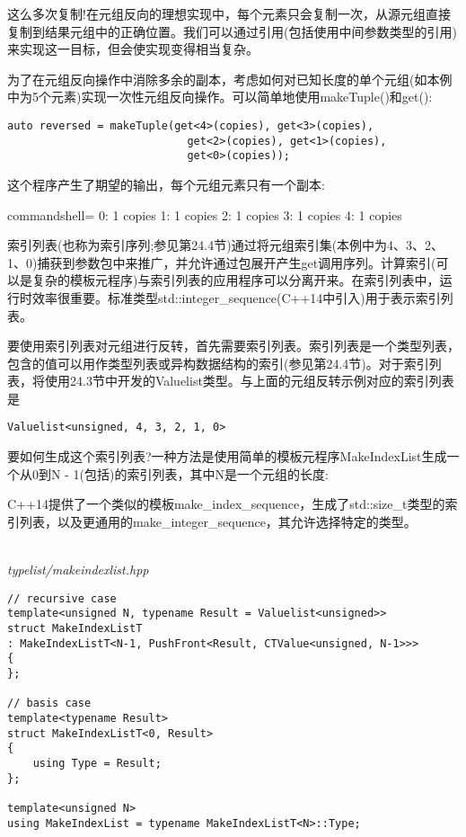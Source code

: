 这么多次复制!在元组反向的理想实现中，每个元素只会复制一次，从源元组直接复制到结果元组中的正确位置。我们可以通过引用(包括使用中间参数类型的引用)来实现这一目标，但会使实现变得相当复杂。

为了在元组反向操作中消除多余的副本，考虑如何对已知长度的单个元组(如本例中为5个元素)实现一次性元组反向操作。可以简单地使用makeTuple()和get():

\begin{lstlisting}[style=styleCXX]
auto reversed = makeTuple(get<4>(copies), get<3>(copies),
							get<2>(copies), get<1>(copies),
							get<0>(copies));
\end{lstlisting}

这个程序产生了期望的输出，每个元组元素只有一个副本:

\begin{tcblisting}{commandshell={}}
0: 1 copies
1: 1 copies
2: 1 copies
3: 1 copies
4: 1 copies
\end{tcblisting}

索引列表(也称为索引序列;参见第24.4节)通过将元组索引集(本例中为4、3、2、1、0)捕获到参数包中来推广，并允许通过包展开产生get调用序列。计算索引(可以是复杂的模板元程序)与索引列表的应用程序可以分离开来。在索引列表中，运行时效率很重要。标准类型std::integer\_sequence(C++14中引入)用于表示索引列表。


要使用索引列表对元组进行反转，首先需要索引列表。索引列表是一个类型列表，包含的值可以用作类型列表或异构数据结构的索引(参见第24.4节)。对于索引列表，将使用24.3节中开发的Valuelist类型。与上面的元组反转示例对应的索引列表是

\begin{lstlisting}[style=styleCXX]
Valuelist<unsigned, 4, 3, 2, 1, 0>
\end{lstlisting}

要如何生成这个索引列表?一种方法是使用简单的模板元程序MakeIndexList生成一个从0到N - 1(包括)的索引列表，其中N是一个元组的长度:

\begin{tcolorbox}[colback=webgreen!5!white,colframe=webgreen!75!black]
\hspace*{0.75cm}C++14提供了一个类似的模板make\_index\_sequence，生成了std::size\_t类型的索引列表，以及更通用的make\_integer\_sequence，其允许选择特定的类型。
\end{tcolorbox}

\hspace*{\fill} \\ %
\noindent
\textit{typelist/makeindexlist.hpp}
\begin{lstlisting}[style=styleCXX]
// recursive case
template<unsigned N, typename Result = Valuelist<unsigned>>
struct MakeIndexListT
: MakeIndexListT<N-1, PushFront<Result, CTValue<unsigned, N-1>>>
{
};

// basis case
template<typename Result>
struct MakeIndexListT<0, Result>
{
	using Type = Result;
};

template<unsigned N>
using MakeIndexList = typename MakeIndexListT<N>::Type;
\end{lstlisting}

